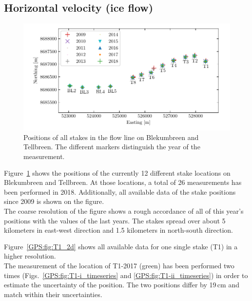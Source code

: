 \subsection{Horizontal velocity (ice flow)}

\begin{figure}[H]
    \centering
    \includegraphics[width=\textwidth]{./figs/stakePositions.pdf}
    \caption{Positions of all stakes in the flow line on Blekumbreen and Tellbreen.
    The different markers distinguish the year of the measurement.}
    \label{GPS:fig:stakepos}
\end{figure}

Figure~\ref{GPS:fig:stakepos} shows the positions of the currently 12 different stake locations
on Blekumbreen and Tellbreen.
At those locations, a total of 26 measurements has been performed in 2018.
Additionally, all available data of the stake positions since 2009 is shown on the figure.\\
The coarse resolution of the figure shows a rough accordance of all of this year's positions with the values 
of the last years.
The stakes spread over about 5 kilometers in east-west direction and 1.5 kilometers in north-south direction.

Figure~\ref{GPS:fig:T1_2d} shows all available data for one single stake (T1) in a higher resolution.\\
The measurement of the location of T1-2017 (green) has been performed two times
(Figs.~\ref{GPS:fig:T1-i_timeseries} and \ref{GPS:fig:T1-ii_timeseries})
in order to estimate the uncertainty
of the position.
The two positions differ by 19\,cm and match within their uncertainties.


